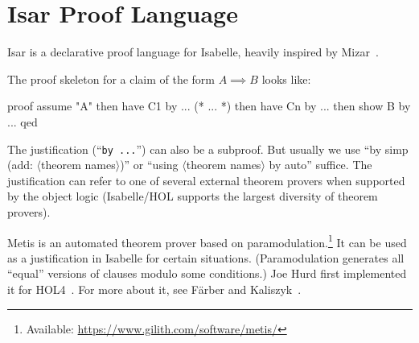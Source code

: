 \section{Isar Proof Language}

\begin{node}\label{isabelle:isar-0000}%
Isar is a declarative proof language for Isabelle, heavily inspired by
Mizar~.
\end{node}

\begin{node}\label{isabelle:isar-0001}%
  The proof skeleton for a claim of the form $A\implies B$ looks like:
\begin{Isabelle}
proof
  assume "A"
  then have C1 by ...
  (* ... *)
  then have Cn by ...
  then show B by ...
qed
\end{Isabelle}

\begin{node}\label{isabelle:isar-0002}%
The justification (``\texttt{by ...}'') can also be a subproof. But
usually we use ``by simp (add: $\langle$theorem names$\rangle$)'' or
``using $\langle$theorem names$\rangle$ by auto'' suffice. The
justification can refer to one of several external theorem provers when
supported by the object logic (Isabelle/HOL supports the largest
diversity of theorem provers).

\begin{node}[Metis]\label{isabelle:isar-0003}%
Metis%
is an automated theorem prover based on
paramodulation.\footnote{Available: \url{https://www.gilith.com/software/metis/}}
It can be used as a justification in Isabelle for certain
situations. (Paramodulation generates all ``equal'' versions of clauses
modulo some conditions.)
Joe Hurd first implemented it for HOL4~\cite{hurd2003first}.
For more about it, see F{\"{a}}rber and Kaliszyk~\cite{farber2015metis}.
\end{node}
\end{node}
\end{node}